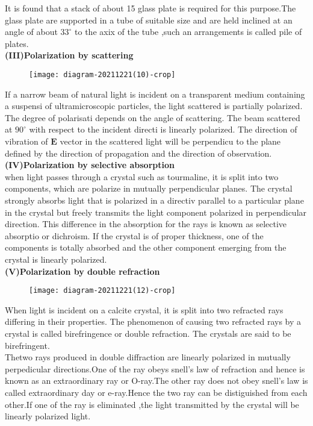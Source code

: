       It is found that a stack of about 15 glass plate is required for this purpose.The glass plate are supported in a tube of suitable size and are held inclined at an angle of about $33^{\circ}$ to the axix of the tube ,such an arrangements is called pile of plates.\\
      \textbf{(III)Polarization by scattering}\\
      \begin{figure}[H]
      	\centering
      	\texttt{[image: diagram-20211221(10)-crop]}
      	\caption{}
      	\label{}
      \end{figure}
      If a narrow beam of natural light is incident on a transparent medium containing a suspensi of ultramicroscopic particles, the light scattered is partially polarized. The degree of polarisati depends on the angle of scattering. The beam scattered at $90^{\circ}$ with respect to the incident directi is linearly polarized. The direction of vibration of $\mathbf{E}$ vector in the scattered light will be perpendicu to the plane defined by the direction of propagation and the direction of observation.\\
      \textbf{(IV)Polarization by selective absorption}\\
     when  light passes through a crystal such as tourmaline, it is split into two components, which are polarize in mutually perpendicular planes. The crystal strongly absorbs light that is polarized in a directiv parallel to a particular plane in the crystal but freely transmits the light component polarized in perpendicular direction. This difference in the absorption for the rays is known as selective absorptio or dichroism. If the crystal is of proper thickness, one of the components is totally absorbed and the other component emerging from the crystal is linearly polarized. \\
     \textbf{(V)Polarization by double refraction}\\
     \begin{figure}[H]
     	\centering
     	\texttt{[image: diagram-20211221(12)-crop]}
     	\caption{}
     	\label{}
     \end{figure}
  When light is incident on a calcite crystal, it is split into two refracted rays differing in their properties. The phenomenon of causing two refracted rays by a crystal is called birefringence or double refraction. The crystals are said to be birefringent.\\
  Thetwo rays produced in double diffraction are linearly polarized in mutually perpedicular directions.One of the ray obeys snell's law of refraction and hence is known as an extraordinary ray or O-ray.The other ray does not obey snell's law is called extraordinary day or e-ray.Hence the two ray can be distiguished from each other.If one of the ray is eliminated ,the light transmitted by the crystal will be linearly polarized light.\\
